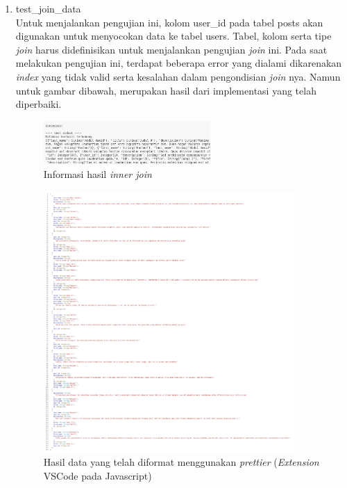 \begin{enumerate}
  \item test\_join\_data \\
  Untuk menjalankan pengujian ini, kolom user\_id pada tabel posts akan digunakan untuk menyocokan data ke tabel users. Tabel, kolom serta tipe \emph{join} harus
  didefinisikan untuk menjalankan pengujian \emph{join} ini. Pada saat melakukan pengujian ini, terdapat beberapa error yang dialami dikarenakan \emph{index} yang tidak valid
  serta kesalahan dalam pengondisian \emph{join} nya. Namun untuk gambar dibawah, merupakan hasil dari implementasi yang telah diperbaiki.
  \begin{figure}[H]
  	\centering{}
	\includegraphics[width=0.6\textwidth]{gambar/bab4/test-join-data-inner.png}
  	\caption{Informasi hasil \emph{inner join}}
   \end{figure}
    \begin{figure}[H]
  	\centering{}
	\includegraphics[width=0.9\textwidth]{gambar/bab4/test-join-data-inner-beautify.png}
  	\caption{Hasil data yang telah diformat menggunakan \emph{prettier} (\emph{Extension} VSCode pada Javascript)}
   \end{figure}
  \begin{figure}[H]

\end{figure}
\end{enumerate}
